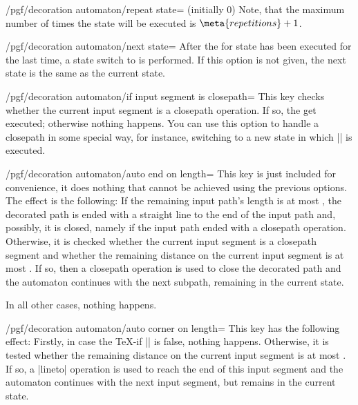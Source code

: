 \begin{command}{\pgfdeclaredecoration{}}
\begin{command}{\state{}}
\begin{key}{/pgf/decoration automaton/repeat state= (initially 0)}
            Note, that the maximum number of times the state will be executed
            is $\meta{repetitions}+1$.
        \end{key}
        \begin{key}{/pgf/decoration automaton/next state=}
            After the  for state has been executed for the last
            time, a state switch to  is performed. If this
            option is not given, the next state is the same as the current
            state.
        \end{key}

        \begin{key}{/pgf/decoration automaton/if input segment is closepath=}
            This key checks whether the current input segment is a closepath
            operation. If so, the  get executed; otherwise
            nothing happens. You can use this option to handle a closepath in
            some special way, for instance, switching to a new state in which
            |\pgfpathclose| is executed.
        \end{key}

        \begin{key}{/pgf/decoration automaton/auto end on length=}
            This key is just included for convenience, it does nothing that
            cannot be achieved using the previous options. The effect is the
            following: If the remaining input path's length is at most
            , the decorated path is ended with a straight line
            to the end of the input path and, possibly, it is closed, namely if
            the input path ended with a closepath operation. Otherwise, it is
            checked whether the current input segment is a closepath segment
            and whether the remaining distance on the current input segment is
            at most . If so, then a closepath operation is used
            to close the decorated path and the automaton continues with the
            next subpath, remaining in the current state.

            In all other cases, nothing happens.
        \end{key}

        \begin{key}{/pgf/decoration automaton/auto corner on length=}
            This key has the following effect: Firstly, in case the \TeX-if
            |\ifpgfdecoratepathhascorners| is false, nothing happens.
            Otherwise, it is tested whether the remaining distance on the
            current input segment is at most . If so, a
            |lineto| operation is used to reach the end of this input segment
            and the automaton continues with the next input segment, but
            remains in the current state.


\end{key}
\end{command}
\end{command}
